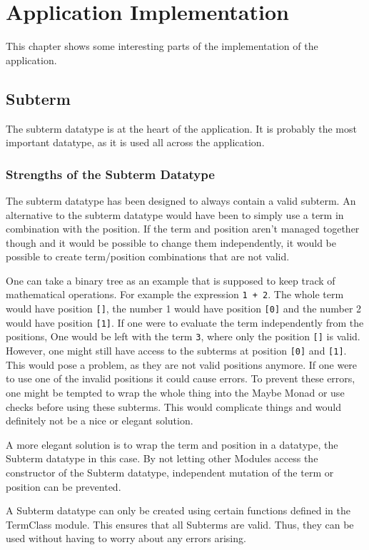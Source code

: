 \chapter{Application Implementation}
This chapter shows some interesting parts of the implementation of the application.

\section{Subterm}
The subterm datatype is at the heart of the application.
It is probably the most important datatype,
as it is used all across the application.

\subsection{Strengths of the Subterm Datatype}
The subterm datatype has been designed to always contain a valid subterm.
An alternative to the subterm datatype would have been to simply use a term in combination with the position.
If the term and position aren't managed together though and it would be possible to change them independently,
it would be possible to create term/position combinations that are not valid.

One can take a binary tree as an example that is supposed to keep track of mathematical operations.
For example the expression \texttt{1 + 2}.
The whole term would have position \texttt{[]}, the number 1 would have position \texttt{[0]} and the number 2 would have position \texttt{[1]}.
If one were to evaluate the term independently from the positions,
One would be left with the term \texttt{3}, where only the position \texttt{[]} is valid.
However, one might still have access to the subterms at position \texttt{[0]} and \texttt{[1]}.
This would pose a problem,
as they are not valid positions anymore.
If one were to use one of the invalid positions it could cause errors.
To prevent these errors,
one might be tempted to wrap the whole thing into the Maybe Monad or use checks before using these subterms.
This would complicate things and would definitely not be a nice or elegant solution.

A more elegant solution is to wrap the term and position in a datatype,
the Subterm datatype in this case.
By not letting other Modules access the constructor of the Subterm datatype,
independent mutation of the term or position can be prevented.

A Subterm datatype can only be created using certain functions defined in the TermClass module.
This ensures that all Subterms are valid.
Thus, they can be used without having to worry about any errors arising.


